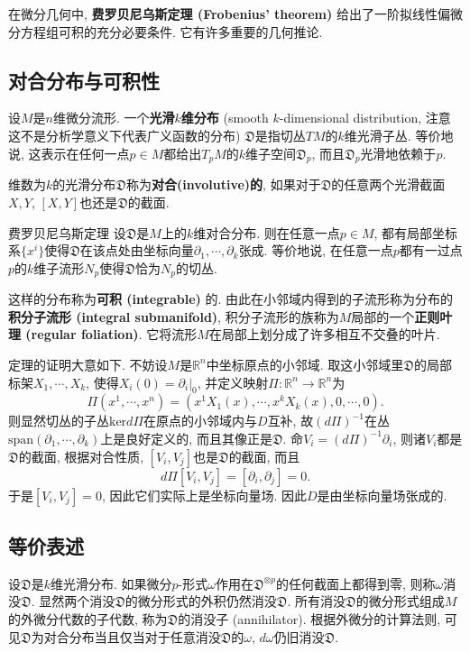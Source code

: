 
在微分几何中, \textbf{费罗贝尼乌斯定理 (Frobenius' theorem)} 给出了一阶拟线性偏微分方程组可积的充分必要条件. 它有许多重要的几何推论.

\subsection{对合分布与可积性}
设$M$是$n$维微分流形. 一个\textbf{光滑$k$维分布} (smooth $k$-dimensional distribution, 注意这不是分析学意义下代表广义函数的分布) $\mathfrak{D}$是指切丛$TM$的$k$维光滑子丛. 等价地说, 这表示在任何一点$p\in M$都给出$T_pM$的$k$维子空间$\mathfrak{D}_p$, 而且$\mathfrak{D}_p$光滑地依赖于$p$. 

维数为$k$的光滑分布$\mathfrak{D}$称为\textbf{对合(involutive)的}, 如果对于$\mathfrak{D}$的任意两个光滑截面$X,Y$, $[X,Y]$也还是$\mathfrak{D}$的截面. 

\begin{theorem}{费罗贝尼乌斯定理}
设$\mathfrak{D}$是$M$上的$k$维对合分布. 则在任意一点$p\in M$, 都有局部坐标系$\{x^i\}$使得$\mathfrak{D}$在该点处由坐标向量$\partial_1,\cdots ,\partial_k$张成. 等价地说, 在任意一点$p$都有一过点$p$的$k$维子流形$N_p$使得$\mathfrak{D}$恰为$N_p$的切丛.
\end{theorem}
这样的分布称为\textbf{可积 (integrable)} 的. 由此在小邻域内得到的子流形称为分布的\textbf{积分子流形 (integral submanifold)}, 积分子流形的族称为$M$局部的一个\textbf{正则叶理 (regular foliation)}. 它将流形$M$在局部上划分成了许多相互不交叠的叶片.

定理的证明大意如下. 不妨设$M$是$\mathbb{R}^n$中坐标原点的小邻域. 取这小邻域里$\mathfrak{D}$的局部标架$X_1,\cdots ,X_k$, 使得$X_i(0)=\partial_i|_0$, 并定义映射$\Pi: \mathbb{R}^n\to \mathbb{R}^n$为
$$
\Pi(x^1,\cdots ,x^n)=(x^1X_1(x),\cdots ,x^kX_k(x),0,\cdots ,0).
$$
则显然切丛的子丛$\text{ker}d\Pi$在原点的小邻域内与$D$互补, 故$(d\Pi)^{-1}$在丛$\text{span}(\partial_1,\cdots ,\partial_k)$上是良好定义的, 而且其像正是$\mathfrak{D}$. 命$V_i=(d\Pi)^{-1}\partial_i$, 则诸$V_i$都是$\mathfrak{D}$的截面, 根据对合性质, $[V_i,V_j]$也是$\mathfrak{D}$的截面, 而且
$$
d\Pi[V_i,V_j]=[\partial_i,\partial_j]=0.
$$
于是$[V_i,V_j]=0$, 因此它们实际上是坐标向量场. 因此$D$是由坐标向量场张成的. 

\subsection{等价表述}
设$\mathfrak{D}$是$k$维光滑分布. 如果微分$p$-形式$\omega$作用在$\mathfrak{D}^{\otimes p}$的任何截面上都得到零, 则称$\omega$消没$\mathfrak{D}$. 显然两个消没$\mathfrak{D}$的微分形式的外积仍然消没$\mathfrak{D}$. 所有消没$\mathfrak{D}$的微分形式组成$M$的外微分代数的子代数, 称为$\mathfrak{D}$的消没子 (annihilator). 根据外微分的计算法则, 可见$\mathfrak{D}$为对合分布当且仅当对于任意消没$\mathfrak{D}$的$\omega$, $d\omega$仍旧消没$\mathfrak{D}$. 

